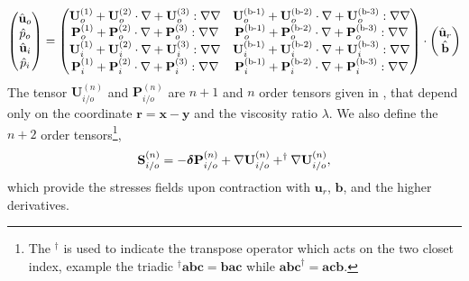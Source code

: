 \begin{align}
    \begin{pmatrix}
        \hat{\textbf{u}}_{o}\\
        \hat{p}_{o}\\
        \hat{\textbf{u}}_{i}\\
        \hat{p}_{i}
    \end{pmatrix}
    =
    \begin{pmatrix}
        \textbf{U}_{o}^{(1)} + \textbf{U}_{o}^{(2)}\cdot \grad + \textbf{U}_{o}^{(3)} :\grad\grad &
        \textbf{U}_{o}^\text{(b-1)} + \textbf{U}_{o}^\text{(b-2)}\cdot \grad + \textbf{U}_{o}^\text{(b-3)} :\grad\grad \\
        \textbf{P}_{o}^{(1)} + \textbf{P}_{o}^{(2)}\cdot \grad + \textbf{P}_{o}^{(3)} :\grad\grad &
        \textbf{P}_{o}^\text{(b-1)} + \textbf{P}_{o}^\text{(b-2)}\cdot \grad + \textbf{P}_{o}^\text{(b-3)} :\grad\grad \\
        \textbf{U}_{i}^{(1)} + \textbf{U}_{i}^{(2)}\cdot \grad + \textbf{U}_{i}^{(3)} :\grad\grad &
        \textbf{U}_{i}^\text{(b-1)} + \textbf{U}_{i}^\text{(b-2)}\cdot \grad + \textbf{U}_{i}^\text{(b-3)} :\grad\grad \\
        \textbf{P}_{i}^{(1)} + \textbf{P}_{i}^{(2)}\cdot \grad + \textbf{P}_{i}^{(3)} :\grad\grad &
        \textbf{P}_{i}^\text{(b-1)} + \textbf{P}_{i}^\text{(b-2)}\cdot \grad + \textbf{P}_{i}^\text{(b-3)} :\grad\grad \\
    \end{pmatrix}
    \cdot 
    \begin{pmatrix}
        \hat{\textbf{u}}_r\\
        \hat{\textbf{b}}
    \end{pmatrix}
    \label{eq:big_solution}
\end{align}
The tensor $\textbf{U}_{i/o}^{(n)}$ and $\textbf{P}_{i/o}^{(n)}$ are $n+1$ and $n$ order tensors given in \citet[Appendix F]{fintzi2024averaged}, that depend only on the coordinate $\textbf{r} = \textbf{x}-\textbf{y}$ and the viscosity ratio $\lambda$.
We also define the $n+2$ order tensors\footnote{The $^\dagger$ is used to indicate the transpose operator which acts on the two closet index, example the triadic $^\dagger\textbf{abc} = \textbf{bac}$ while $\textbf{abc}^\dagger = \textbf{acb}$. }, 
\begin{equation}
    \textbf{S}_{i/o}^{(n)} = 
    - \bm\delta\textbf{P}_{i/o}^{(n)}
    + \grad \textbf{U}_{i/o}^{(n)}
    + ^\dagger\grad \textbf{U}_{i/o}^{(n)},
    \label{eq:big_S}
\end{equation}
which provide the stresses fields upon contraction with $\textbf{u}_r$, $\textbf{b}$, and the higher derivatives. 

